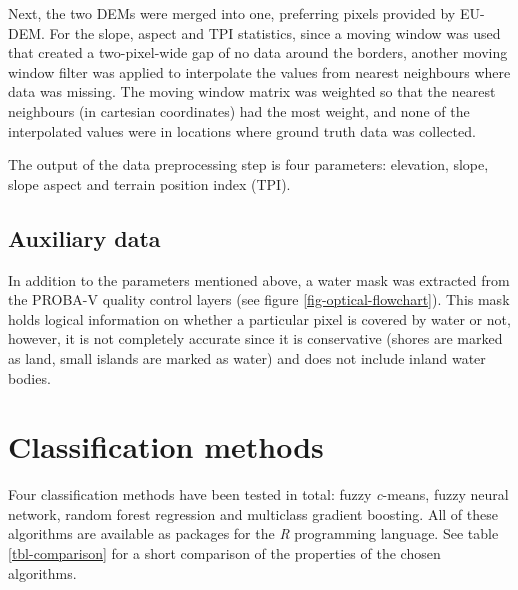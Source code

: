 \documentclass[a4paper,10pt]{book}
\begin{document}
Next, the two DEMs were merged into one, preferring pixels provided by EU-DEM. For the slope, aspect and TPI statistics, since a moving window was used that created a two-pixel-wide gap of no data around the borders, another moving window filter was applied to interpolate the values from nearest neighbours where data was missing. The moving window matrix was weighted so that the nearest neighbours (in cartesian coordinates) had the most weight, and none of the interpolated values were in locations where ground truth data was collected.

The output of the data preprocessing step is four parameters: elevation, slope, slope aspect and terrain position index (TPI).

\subsection{Auxiliary data}

In addition to the parameters mentioned above, a water mask was extracted from the PROBA-V quality control layers (see figure \ref{fig-optical-flowchart}). This mask holds logical information on whether a particular pixel is covered by water or not, however, it is not completely accurate since it is conservative (shores are marked as land, small islands are marked as water) and does not include inland water bodies.

\section{Classification methods}

Four classification methods have been tested in total: fuzzy \textit{c}-means, fuzzy neural network, random forest regression and multiclass gradient boosting. All of these algorithms are available as packages for the \textit{R} programming language. See table \ref{tbl-comparison} for a short comparison of the properties of the chosen algorithms.

\begin{table}
  \begin{center}
  \end{center}
  \caption{Feature comparison between classification methods whose classification accuracy will be compared in the thesis. ``Partially fuzzy'' means the capability of training only on endmember pixels.}
  \label{tbl-comparison}
\end{table}
\end{document}
